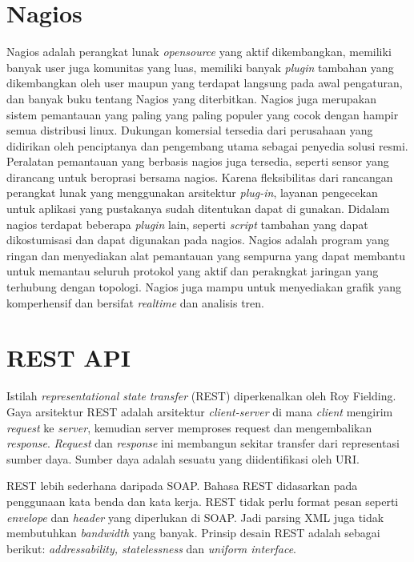 		\section{Nagios}
			Nagios adalah perangkat lunak \textit{opensource} yang aktif dikembangkan, memiliki banyak user juga komunitas yang luas, memiliki banyak \textit{plugin} tambahan yang dikembangkan oleh user maupun yang terdapat langsung pada awal pengaturan, dan banyak buku tentang Nagios yang diterbitkan. Nagios juga merupakan sistem pemantauan yang paling yang paling populer yang cocok dengan hampir semua distribusi linux. Dukungan komersial tersedia dari perusahaan yang didirikan oleh penciptanya dan pengembang utama sebagai penyedia solusi resmi. Peralatan pemantauan yang berbasis nagios juga tersedia, seperti sensor yang dirancang untuk beroprasi bersama nagios. Karena fleksibilitas dari rancangan perangkat lunak yang menggunakan arsitektur \textit{plug-in}, layanan pengecekan untuk aplikasi yang pustakanya sudah ditentukan dapat di gunakan. Didalam nagios terdapat beberapa \textit{plugin} lain, seperti \textit{script} tambahan yang dapat dikostumisasi dan dapat digunakan pada nagios. Nagios adalah program yang ringan dan menyediakan alat pemantauan yang sempurna yang dapat membantu untuk memantau seluruh protokol yang aktif dan perakngkat jaringan yang terhubung dengan topologi. Nagios juga mampu untuk menyediakan grafik yang komperhensif dan bersifat \textit{realtime} dan analisis tren.
			
		\section{REST API}
			Istilah \textit{representational state transfer} (REST) diperkenalkan oleh Roy Fielding. Gaya arsitektur REST adalah arsitektur \textit{client-server} di mana \textit{client} mengirim \textit{request} ke \textit{server}, kemudian server memproses request dan mengembalikan \textit{response}. \textit{Request} dan \textit{response} ini membangun sekitar transfer dari representasi sumber daya. Sumber daya adalah sesuatu yang diidentifikasi oleh URI.
			
			REST lebih sederhana daripada SOAP. Bahasa REST didasarkan pada 
			penggunaan kata benda dan kata kerja. REST tidak perlu format pesan seperti \textit{envelope} dan \textit{header} yang diperlukan di SOAP. Jadi parsing XML juga tidak membutuhkan \textit{bandwidth} yang banyak. Prinsip desain REST adalah sebagai berikut: \textit{addressability, statelessness} dan \textit{uniform interface}.
			
